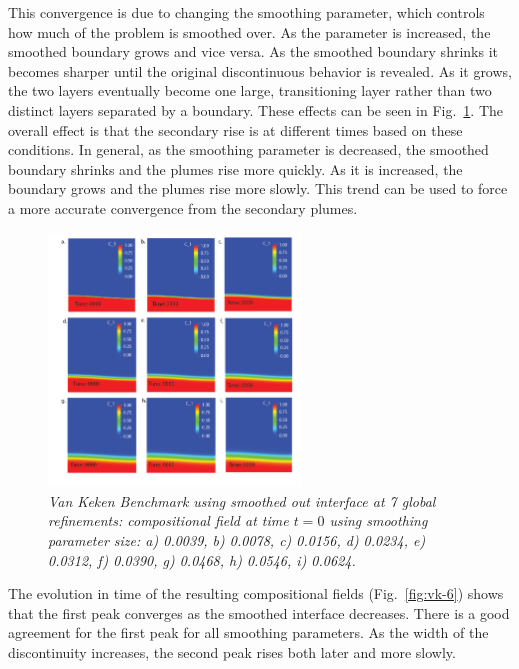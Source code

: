 \documentclass{article}
\begin{document}
This convergence is due to changing the smoothing parameter, which controls how much of the problem is smoothed over.  As the parameter is increased, the smoothed boundary grows and vice versa.  As the smoothed boundary shrinks it becomes sharper until the original discontinuous behavior is revealed.  As it grows, the two layers eventually become one large, transitioning layer rather than two distinct layers separated by a boundary.  These effects can be seen in Fig.~\ref{fig:vk-5}.  The overall effect is that the secondary rise is at different times based on these conditions.  In general, as the smoothing parameter is decreased, the smoothed boundary shrinks and the plumes rise more quickly.  As it is increased, the boundary grows and the plumes rise more slowly.  This trend can be used to force a more accurate convergence from the secondary plumes.

\begin{figure}
        \centering
        \includegraphics[width=0.6\textwidth]{cookbooks/benchmarks/van-keken/smoothing-parameter.png}
        \caption{\it Van Keken Benchmark using smoothed out interface at 7 global refinements: compositional field at time $t=0$ using smoothing parameter size: a) 0.0039, b) 0.0078, c) 0.0156, d) 0.0234, e) 0.0312, f) 0.0390, g) 0.0468, h) 0.0546, i) 0.0624.}
        \label{fig:vk-5}
\end{figure}

The evolution in time of the resulting compositional fields (Fig.~\ref{fig:vk-6}) shows that the first peak converges as the smoothed interface decreases. There is a good agreement for the first peak for all smoothing parameters.  As the width of the discontinuity increases, the second peak rises both later and more slowly.
\end{document}
